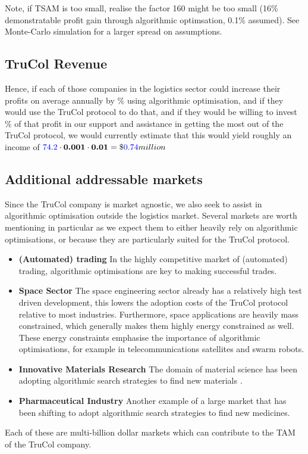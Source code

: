Note, if TSAM is too small, realise the factor 160 might be too small (16\% demonstratable profit gain through algorithmic optimsation, 0.1\% assumed). See Monte-Carlo simulation for a larger spread on assumptions.



\subsection{TruCol Revenue}
Hence, if each of those companies in the logistics sector could increase their profits on average annually by \textbf{\avgalgooptimisationprofitpercentage}\% using algorithmic optimisation, and if they would use the TruCol protocol to do that, and if they would be willing to invest \textbf{\TruColcutonprofitpercentage}\% of that profit in our support and assistance in getting the most out of the TruCol protocol, we would currently estimate that this would yield roughly an income of $\textcolor{blue}{74.2}\cdot \textbf{0.001}\cdot \textbf{0.01}=\$\textcolor{blue}{0.74} million$

\subsection{Additional addressable markets}\label{subsubsec:additional_markets}
Since the TruCol company is market agnostic, we also seek to assist in algorithmic optimisation outside the logistics market. Several markets are worth mentioning in particular as we expect them to either heavily rely on algorithmic optimisations, or because they are particularly suited for the TruCol protocol.
\begin{itemize}
	\item \textbf{(Automated) trading} In the highly competitive market of (automated) trading, algorithmic optimisations are key to making successful trades.
	\item \textbf{Space Sector} The space engineering sector already has a relatively high test driven development\cite{todo}, this lowers the adoption costs of the TruCol protocol relative to most industries. Furthermore, space applications are heavily mass constrained, which generally makes them highly energy constrained as well. These energy constraints emphasise the importance of algorithmic optimisations, for example in telecommunications satellites and swarm robots.
	\item \textbf{Innovative Materials Research} The domain of material science has been adopting algorithmic search strategies to find new materials  \cite{allahyari2020coevolutionary}.
	\item \textbf{Pharmaceutical Industry} Another example of a large market that has been shifting to adopt algorithmic search strategies to find new medicines.
\end{itemize}
Each of these are multi-billion dollar markets which can contribute to the TAM of the TruCol company.
